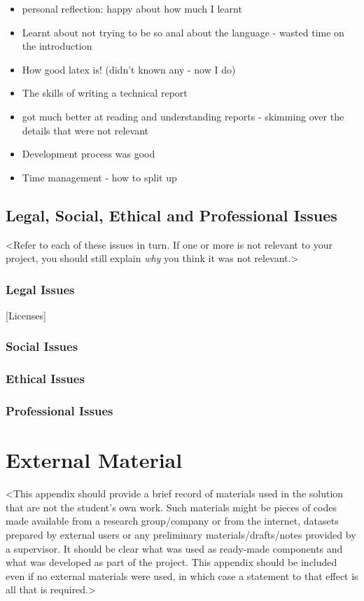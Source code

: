 \begin{appendices}
\begin{itemize}
	\item personal reflection: happy about how much I learnt
	\item Learnt about not trying to be so anal about the language - wasted time on the introduction
	\item How good latex is! (didn't known any - now I do)
	\item The skills of writing a technical report
	\item got much better at reading and understanding reports - skimming over the details that were not relevant
	\item Development process was good
	\item Time management - how to split up 
\end{itemize}

\section{Legal, Social, Ethical and Professional Issues}

<Refer to each of these issues in turn. If one or more is not relevant to your project, you should still explain {\em why} you think it was not relevant.>

\subsection{Legal Issues}

[Licenses]


\subsection{Social Issues}



\subsection{Ethical Issues}

\subsection{Professional Issues}


%
%
\chapter{External Material} \label{ExternalMaterial}
<This appendix should provide a brief record of materials used in the solution that are not the student's own work. Such materials might be pieces of codes made available from a research group/company or from the internet, datasets prepared by external users or any preliminary materials/drafts/notes provided by a supervisor. It should be clear what was used as ready-made components and what was developed as part of the project. This appendix should be included even if no external materials were used, in which case a statement to that effect is all that is required.>


\end{appendices}
